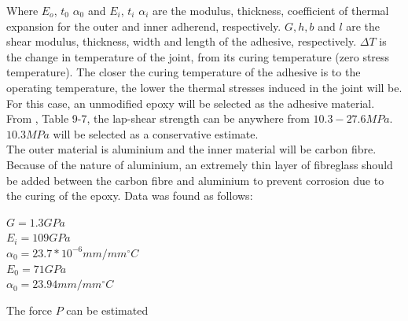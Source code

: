\documentclass[../main.tex]{subfiles}
\begin{document}
Where $E_o$, $t_0$ $\alpha _0$ and $E_i$, $t_i$ $\alpha _i$ are the modulus, thickness, coefficient of thermal expansion for the outer and inner adherend, respectively. $G, h, b$ and $l$ are the shear modulus, thickness, width and length of the adhesive, respectively. $\Delta T$ is the change in temperature of the joint, from its curing temperature (zero stress temperature). The closer the curing temperature of the adhesive is to the operating temperature, the lower the thermal stresses induced in the joint will be.\\

For this case, an unmodified epoxy will be selected as the adhesive material. From \cite{shigley}, Table 9-7, the lap-shear strength can be anywhere from $10.3-27.6MPa$. $10.3 MPa$ will be selected as a conservative estimate.\\

The outer material is aluminium and the inner material will be carbon fibre. Because of the nature of aluminium, an extremely thin layer of fibreglass should be added between the carbon fibre and aluminium to prevent corrosion due to the curing of the epoxy. Data was found as follows:

\begin{center}
$G=1.3 GPa$ \cite{epoxyShear}\\
$E_i=109GPa$ \cite{carbonFibre}\\
$\alpha _0=23.7*10^{-6}mm/mm^{\circ}C$ \cite{carbonFibre}\\
$E_0=71GPa$ \cite{shigley}\\
$\alpha _0=23.94 mm/mm^{\circ}C$ \cite{shigley}\\
\end{center}

The force $P$ can be estimated 
\end{document}
